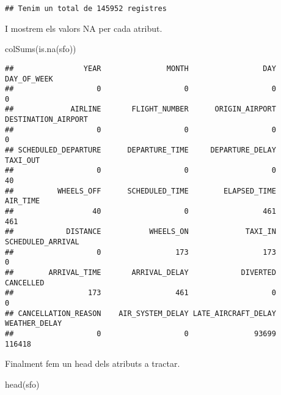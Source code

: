 \documentclass[
]{article}
\newenvironment{Shaded}{\begin{snugshade}}{\end{snugshade}}
\newcommand{\KeywordTok}[1]{\textcolor[rgb]{0.94,0.87,0.69}{#1}}
\newcommand{\NormalTok}[1]{\textcolor[rgb]{0.80,0.80,0.80}{#1}}
\begin{document}
\begin{verbatim}
## Tenim un total de 145952 registres
\end{verbatim}

I mostrem els valors NA per cada atribut.

\begin{Shaded}
\begin{Highlighting}[]
\KeywordTok{colSums}\NormalTok{(}\KeywordTok{is.na}\NormalTok{(sfo))}
\end{Highlighting}
\end{Shaded}

\begin{verbatim}
##                YEAR               MONTH                 DAY         DAY_OF_WEEK 
##                   0                   0                   0                   0 
##             AIRLINE       FLIGHT_NUMBER      ORIGIN_AIRPORT DESTINATION_AIRPORT 
##                   0                   0                   0                   0 
## SCHEDULED_DEPARTURE      DEPARTURE_TIME     DEPARTURE_DELAY            TAXI_OUT 
##                   0                   0                   0                  40 
##          WHEELS_OFF      SCHEDULED_TIME        ELAPSED_TIME            AIR_TIME 
##                  40                   0                 461                 461 
##            DISTANCE           WHEELS_ON             TAXI_IN   SCHEDULED_ARRIVAL 
##                   0                 173                 173                   0 
##        ARRIVAL_TIME       ARRIVAL_DELAY            DIVERTED           CANCELLED 
##                 173                 461                   0                   0 
## CANCELLATION_REASON    AIR_SYSTEM_DELAY LATE_AIRCRAFT_DELAY       WEATHER_DELAY 
##                   0                   0               93699              116418
\end{verbatim}

Finalment fem un head dels atributs a tractar.

\begin{Shaded}
\begin{Highlighting}[]
\KeywordTok{head}\NormalTok{(sfo)}
\end{Highlighting}
\end{Shaded}
\end{document}
